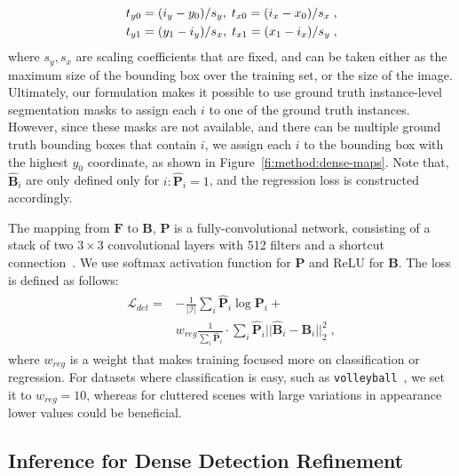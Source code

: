 \documentclass[10pt,twocolumn,letterpaper]{article}
\newcommand{\bF}[0]{\mathbf{F}}
\newcommand{\bP}[0]{\mathbf{P}}
\newcommand{\bB}[0]{\mathbf{B}}
\newcommand{\mL}[0]{\mathcal{L}}
\newcommand{\mI}[0]{\mathcal{I}}
\begin{document}
\begin{align}
\vspace{-0.5cm}
t_{y0} = (i_y - y_0) / s_y, \; t_{x0} = (i_x - x_0) / s_x \;,\\
t_{y1} = (y_1 - i_y) / s_x, \; t_{x1} = (x_1 - i_x) / s_y \;,
\label{eq:method:boxes-map}
\end{align}
where $s_y, s_x$ are scaling coefficients that are fixed, and can be taken
either as the maximum size of the bounding box over the training set, or the
size of the image. Ultimately, our formulation makes it possible to use
ground truth instance-level segmentation masks to assign each $i$ to one of the ground
truth instances. However, since these masks  are not available, and there 
can be multiple ground truth bounding boxes that contain $i$, we
assign each $i$ to the bounding box with the highest $y_0$ coordinate, 
as shown in Figure~\ref{fi:method:dense-maps}. Note that, $\hat{\bB}_i$ are only
defined only for $i: \hat{\bP}_i = 1$, and the regression loss is constructed 
accordingly.

The mapping from $\bF$ to $\bB$, $\bP$ is a fully-convolutional network,
consisting of a stack of two $3\times 3$ convolutional layers with 512 filters 
and a shortcut connection~\cite{He2016}. We use softmax activation function for
$\bP$ and ReLU for $\bB$. The loss is defined as follows:
\begin{align}
\begin{split}
\mL_{det} = & - \frac{1}{|\mI|} \sum_{i}\hat{\bP}_{i} \log \bP_{i} + \\
           & w_{reg}
\frac{1}{\sum_{i}\hat{\bP}_{i}} \cdot \sum_{i}\hat{\bP}_{i} ||\hat{\bB}_{i} -
\bB_{i}||_2^2 \;,
\label{eq:method:loss-detection}
\end{split}
\end{align}
where $w_{reg}$ is a weight that makes training focused
more on classification or regression. For datasets where classification is easy,
such as \texttt{volleyball}~\cite{Ibrahim2016}, we set it to $w_{reg} = 10$, 
whereas for cluttered scenes with large variations in appearance lower values could be
beneficial.




\subsection{Inference for Dense Detection Refinement}
\vspace{-0.15cm}
\label{sec:method:inference}
\end{document}
